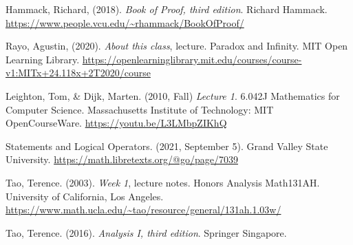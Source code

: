 \documentclass{article}[12pt]
\begin{document}
    \begin{thebibliography}{9}
        
        Hammack, Richard, (2018). \emph{Book of Proof, third edition}. Richard Hammack. \url{https://www.people.vcu.edu/~rhammack/BookOfProof/}
        
        Rayo, Agustin, (2020). \emph{About this class}, lecture. Paradox and Infinity. MIT Open Learning Library. \url{https://openlearninglibrary.mit.edu/courses/course-v1:MITx+24.118x+2T2020/course}
        
        Leighton, Tom, \& Dijk, Marten. (2010, Fall) \emph{Lecture 1}. 6.042J Mathematics for Computer Science. Massachusetts Institute of Technology: MIT OpenCourseWare. \url{https://youtu.be/L3LMbpZIKhQ}
        
        Statements and Logical Operators. (2021, September 5). Grand Valley State University. \url{https://math.libretexts.org/@go/page/7039}
        
        Tao, Terence. (2003). \emph{Week 1}, lecture notes. Honors Analysis Math131AH. University of California, Los Angeles. \url{https://www.math.ucla.edu/~tao/resource/general/131ah.1.03w/}
        
        Tao, Terence. (2016). \emph{Analysis I, third edition}. Springer Singapore.
        
    \end{thebibliography}
    
\end{document}
